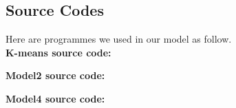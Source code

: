 
\begin{appendices}

\section{Source Codes}
Here are programmes we used in our model as follow.\\
\textbf{\textcolor[rgb]{0.98,0.00,0.00}{K-means source code:}}

\textbf{\textcolor[rgb]{0.98,0.00,0.00}{Model2 source code:}}

\textbf{\textcolor[rgb]{0.98,0.00,0.00}{Model4 source code:}}


\end{appendices}